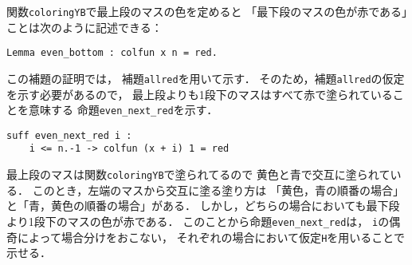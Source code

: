 関数{\tt{coloringYB}}で最上段のマスの色を定めると
「最下段のマスの色が赤である」ことは次のように記述できる：
\begin{lstlisting}[language=Coq]
  Lemma even_bottom : colfun x n = red.
\end{lstlisting}
この補題の証明では，
補題{\tt{allred}}を用いて示す．
そのため，補題{\tt{allred}}の仮定を示す必要があるので，
最上段よりも1段下のマスはすべて赤で塗られていることを意味する
命題{\tt{even\_next\_red}}を示す．
\begin{lstlisting}[language=Coq]
  suff even_next_red i :
    i <= n.-1 -> colfun (x + i) 1 = red
\end{lstlisting}
最上段のマスは関数{\tt{coloringYB}}で塗られてるので
黄色と青で交互に塗られている．
このとき，左端のマスから交互に塗る塗り方は
「黄色，青の順番の場合」と「青，黄色の順番の場合」がある．
しかし，どちらの場合においても最下段より1段下のマスの色が赤である．
このことから命題{\tt{even\_next\_red}}は，
{\tt{i}}の偶奇によって場合分けをおこない，
それぞれの場合において仮定{\tt{H}}を用いることで示せる．

